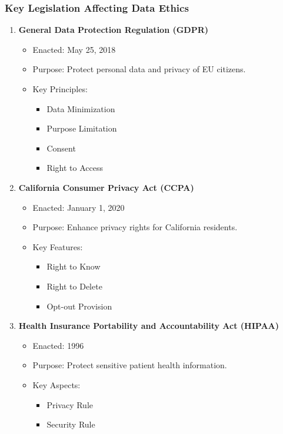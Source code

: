 \documentclass[aspectratio=169]{beamer}
\begin{document}
\begin{frame}[fragile]
    \frametitle{Key Legislation Affecting Data Ethics}
    \begin{enumerate}
        \item \textbf{General Data Protection Regulation (GDPR)}
            \begin{itemize}
                \item Enacted: May 25, 2018
                \item Purpose: Protect personal data and privacy of EU citizens.
                \item Key Principles:
                    \begin{itemize}
                        \item Data Minimization
                        \item Purpose Limitation
                        \item Consent
                        \item Right to Access
                    \end{itemize}
            \end{itemize}
        \item \textbf{California Consumer Privacy Act (CCPA)}
            \begin{itemize}
                \item Enacted: January 1, 2020
                \item Purpose: Enhance privacy rights for California residents.
                \item Key Features:
                    \begin{itemize}
                        \item Right to Know
                        \item Right to Delete
                        \item Opt-out Provision
                    \end{itemize}
            \end{itemize}
        \item \textbf{Health Insurance Portability and Accountability Act (HIPAA)}
            \begin{itemize}
                \item Enacted: 1996
                \item Purpose: Protect sensitive patient health information.
                \item Key Aspects:
                    \begin{itemize}
                        \item Privacy Rule
                        \item Security Rule
                    \end{itemize}
            \end{itemize}
    \end{enumerate}
\end{frame}
\end{document}
